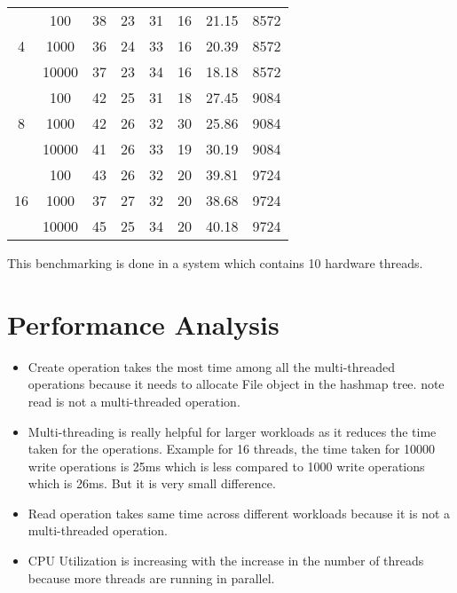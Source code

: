 \documentclass{article}
\begin{document}
\begin{table}[H]
\begin{tabular}{cccccccc}
    \multirow{3}{*}{4} & 100 & 38 & 23 & 31 & 16 & 21.15 & 8572 \\
        & 1000 & 36 & 24 & 33 & 16 & 20.39 & 8572 \\
        & 10000 & 37 & 23 & 34 & 16 & 18.18 & 8572 \\
        \midrule

    \multirow{3}{*}{8} & 100 & 42 & 25 & 31 & 18 & 27.45 & 9084 \\
        & 1000 & 42 & 26 & 32 & 30 & 25.86 & 9084 \\
        & 10000 & 41 & 26 & 33 & 19 & 30.19 & 9084 \\
        \midrule

    \multirow{3}{*}{16} & 100 & 43 & 26 & 32 & 20 & 39.81 & 9724 \\
        & 1000 & 37 & 27 & 32 & 20 & 38.68 & 9724 \\
        & 10000 & 45 & 25 & 34 & 20 & 40.18 & 9724 \\
    \midrule
    \bottomrule
    \end{tabular}
\end{table}

\noindent This benchmarking is done in a system which contains 10 hardware threads.

\section{Performance Analysis}
\begin{itemize}
    \item Create operation takes the most time among all the multi-threaded operations because it needs to allocate File object in the hashmap tree. note read is not a multi-threaded operation.
    \item Multi-threading is really helpful for larger workloads as it reduces the time taken for the operations. Example for 16 threads, the time taken for 10000 write operations is 25ms which is less compared to 1000 write operations which is 26ms. But it is very small difference.
    \item Read operation takes same time across different workloads because it is not a multi-threaded operation.
    \item CPU Utilization is increasing with the increase in the number of threads because more threads are running in parallel.
\end{itemize}
\end{document}
